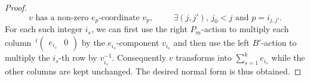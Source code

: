 \documentclass[pdftex]{sigma}
\numberwithin{equation}{section}
\theoremstyle{definition}
\theoremstyle{plain}
\theoremstyle{plain}
\theoremstyle{plain}
\theoremstyle{plain}
\begin{document}
\begin{proof}
	\begin{equation*}
		v \text{ has a non-zero } e_{p}\text{-coordinate } v_p, \hspace{1cm} \exists (j,j'), \, j_0 < j \text{ and } p = i_{j,j'}.
	\end{equation*}
	For each such integer $i_s$, we can first use the right $P_{\underline m}$-action to multiply each column $\,^t\begin{pmatrix}
		e_{i_s} & 0
	\end{pmatrix}$
	by the $e_{i_s}$-component $v_{i_s}$ and then use the left $B'$-action to multiply the $i_s$-th row by $v_{i_s}^{-1}$. Consequently $v$ transforms into $\sum_{s=1}^k e_{i_s}$	while the other columns are kept unchanged.
	The desired normal form is thus obtained.
\end{proof}
\end{document}
